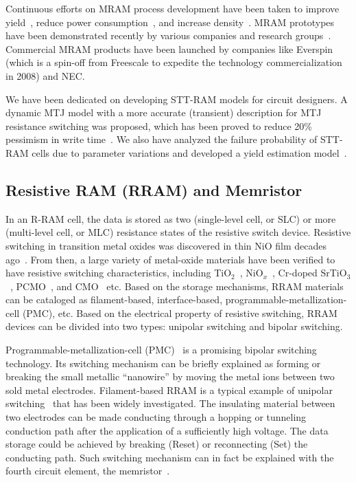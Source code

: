 Continuous efforts on MRAM process development have been taken to improve yield~\cite{Miura07}, reduce power consumption~\cite{Durlam03}, and increase density~\cite{Lou08}. MRAM prototypes have been demonstrated recently by various companies and research groups~\cite{Hosomi05,Kawahara07,Nebashi09,Motoyoshi04,Andre05,Kawahara08}. Commercial MRAM products have been launched by companies like Everspin (which is a spin-off from Freescale to expedite the technology commercialization in 2008) and NEC.

We have been dedicated on developing STT-RAM models for circuit designers. A dynamic MTJ model with a more accurate (transient) description for MTJ resistance switching was proposed, which has been proved to reduce 20\% pessimism in write time~\cite{Chen08}. We also have analyzed the failure probability of STT-RAM cells due to parameter variations and developed a yield estimation model~\cite{Li09}.

\subsection{Resistive RAM (RRAM) and Memristor}
In an R-RAM cell, the data is stored as two (single-level cell, or SLC) or more (multi-level cell, or MLC) resistance states of the resistive switch device. Resistive switching in transition metal oxides was discovered in thin NiO film decades ago~\cite{Gibbons64}. From then, a large variety of metal-oxide materials have been verified to have resistive switching characteristics, including TiO$_2$~\cite{Fujimoto06}, NiO$_x$~\cite{Jung07}, Cr-doped SrTiO$_3$~\cite{Janousch07}, PCMO~\cite{Liu00}, and CMO~\cite{Hsu07} etc. Based on the storage mechanisms, RRAM materials can be cataloged as filament-based, interface-based, programmable-metallization-cell (PMC), etc. Based on the electrical property of resistive switching, RRAM devices can be divided into two types: unipolar switching and bipolar switching.

Programmable-metallization-cell (PMC)~\cite{Kozicki05} is a promising bipolar switching technology. Its switching mechanism can be briefly explained as forming or breaking the small metallic ``nanowire'' by moving the metal ions between two sold metal electrodes. Filament-based RRAM is a typical example of unipolar switching~\cite{Inoue} that has been widely investigated. The insulating material between two electrodes can be made conducting through a hopping or tunneling conduction path after the application of a sufficiently high voltage. The data storage could be achieved by breaking (Reset) or reconnecting (Set) the conducting path. Such switching mechanism can in fact be explained with the fourth circuit element, the memristor~\cite{Chua71,Tour08,Strukov08}.


